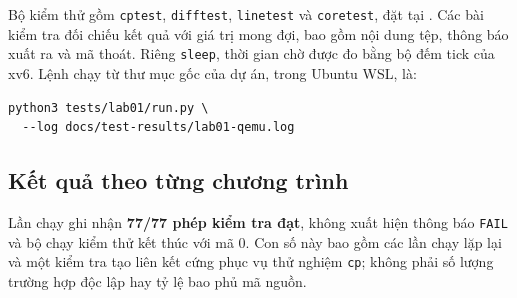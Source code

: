 \documentclass[12pt,a4paper]{article}
\begin{document}
Bộ kiểm thử gồm \texttt{cptest}, \texttt{difftest}, \texttt{linetest} và \texttt{coretest}, đặt tại . Các bài kiểm tra đối chiếu kết quả với giá trị mong đợi, bao gồm nội dung tệp, thông báo xuất ra và mã thoát. Riêng \texttt{sleep}, thời gian chờ được đo bằng bộ đếm tick của xv6. Lệnh chạy từ thư mục gốc của dự án, trong Ubuntu WSL, là:

\begin{terminalbox}
\small
\begin{verbatim}
python3 tests/lab01/run.py \
  --log docs/test-results/lab01-qemu.log
\end{verbatim}
\end{terminalbox}

\subsection{Kết quả theo từng chương trình}

Lần chạy ghi nhận \textbf{77/77 phép kiểm tra đạt}, không xuất hiện thông báo \texttt{FAIL} và bộ chạy kiểm thử kết thúc với mã 0. Con số này bao gồm các lần chạy lặp lại và một kiểm tra tạo liên kết cứng phục vụ thử nghiệm \texttt{cp}; không phải số lượng trường hợp độc lập hay tỷ lệ bao phủ mã nguồn.
\end{document}
